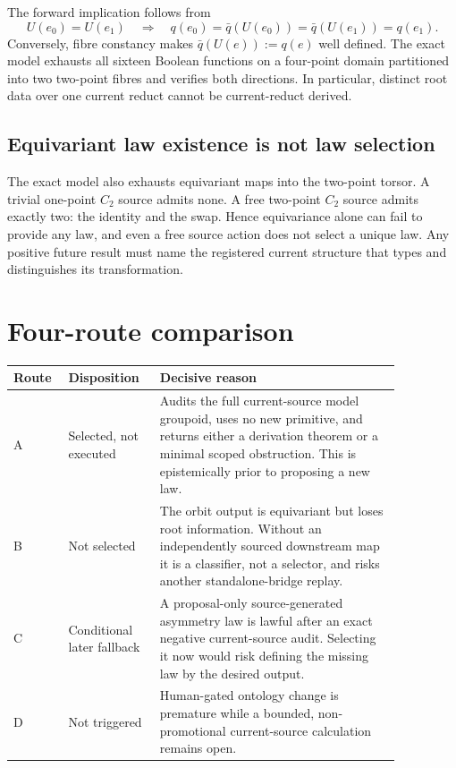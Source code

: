 \documentclass[11pt]{article}
\begin{document}
The forward implication follows from
\[
  U(e_0)=U(e_1)
  \quad\Longrightarrow\quad
  q(e_0)=\bar q(U(e_0))=\bar q(U(e_1))=q(e_1).
\]
Conversely, fibre constancy makes
$\bar q(U(e)):=q(e)$ well defined.  The exact model exhausts all sixteen
Boolean functions on a four-point domain partitioned into two two-point
fibres and verifies both directions.  In particular, distinct root data over
one current reduct cannot be current-reduct derived.

\subsection{Equivariant law existence is not law selection}

The exact model also exhausts equivariant maps into the two-point torsor.  A
trivial one-point $C_2$ source admits none.  A free two-point $C_2$ source
admits exactly two: the identity and the swap.  Hence equivariance alone can
fail to provide any law, and even a free source action does not select a unique
law.  Any positive future result must name the registered current structure
that types and distinguishes its transformation.

\section{Four-route comparison}

\begin{center}
\small
\begin{tabular}{>{\raggedright\arraybackslash}p{0.10\linewidth}
                >{\raggedright\arraybackslash}p{0.19\linewidth}
                >{\raggedright\arraybackslash}p{0.57\linewidth}}
\toprule
Route & Disposition & Decisive reason \\
\midrule
A & Selected, not executed & Audits the full current-source model groupoid,
uses no new primitive, and returns either a derivation theorem or a minimal
scoped obstruction.  This is epistemically prior to proposing a new law. \\
B & Not selected & The orbit output is equivariant but loses root information.
Without an independently sourced downstream map it is a classifier, not a
selector, and risks another standalone-bridge replay. \\
C & Conditional later fallback & A proposal-only source-generated asymmetry
law is lawful after an exact negative current-source audit.  Selecting it now
would risk defining the missing law by the desired output. \\
D & Not triggered & Human-gated ontology change is premature while a bounded,
non-promotional current-source calculation remains open. \\
\bottomrule
\end{tabular}
\end{center}
\end{document}

